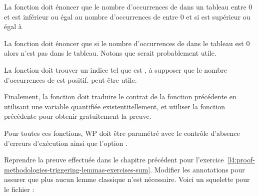 La fonction  doit énoncer que le nombre d'occurrences
de  dans un tableau entre 0 et  est inférieur
ou égal au nombre d'occurrences de  entre 0 et  si
 est supérieur ou égal à 


La fonction  doit énoncer que si le nombre 
d'occurrences de  dans le tableau est 0 alors  n'est
pas dans le tableau. Notons que  serait probablement
utile.


La fonction  doit trouver un indice 
tel que  est , à supposer que le nombre 
d'occurrences de  est positif.  peut
être utile.


Finalement, la fonction  doit traduire le contrat
de la fonction précédente en utilisant une variable quantifiée existentitellement,
et utiliser la fonction précédente pour obtenir gratuitement la preuve.


Pour toutes ces fonctions, WP doit être paramétré avec le contrôle d'absence
d'erreurs d'exécution ainsi que l'option .




Reprendre la preuve effectuée dans le chapitre précédent pour 
l'exercice~\ref{l4:proof-methodologies-triggering-lemmas-exercises-sum}. Modifier
les annotations pour assurer que plus aucun lemme classique n'est nécessaire.
Voici un squelette pour le fichier :



